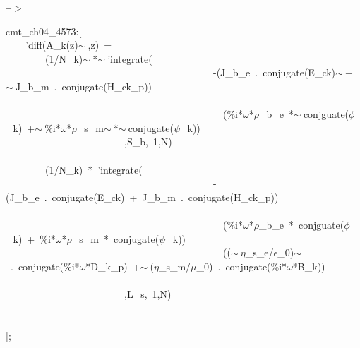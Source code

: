 \documentclass[fleqn]{article}
\begin{document}
\noindent
\begin{minipage}[t]{4.000000em}\color{red}\bfseries
 --\ensuremath{\ensuremath{>}}	
\end{minipage}
\begin{minipage}[t]{\textwidth}\color{blue}
cmt\_ch04\_4573:[\\
\ \ \ \ 'diff(A\_k(z)\ensuremath{\sim\ },z)\ =\ \\
\ \ \ \ \ \ \ \ (1/N\_k)\ensuremath{\sim\ }*\ensuremath{\sim\ }'integrate(\ \\
\ \ \ \ \ \ \ \ \ \ \ \ \ \ \ \ \ \ \ \ \ \ \ \ \ \ \ \ \ \ \ \ \ \ \ \ \ \ \ \ \ \ -(J\_b\_e\ .\ conjugate(E\_ck)\ensuremath{\sim\ }+\ensuremath{\sim\ }J\_b\_m\ .\ conjugate(H\_ck\_p))\ \\
\ \ \ \ \ \ \ \ \ \ \ \ \ \ \ \ \ \ \ \ \ \ \ \ \ \ \ \ \ \ \ \ \ \ \ \ \ \ \ \ \ \ \ \ +\\
\ \ \ \ \ \ \ \ \ \ \ \ \ \ \ \ \ \ \ \ \ \ \ \ \ \ \ \ \ \ \ \ \ \ \ \ \ \ \ \ \ \ \ \ (\%i*\ensuremath{\omega}*\ensuremath{\rho}\_b\_e\ *\ensuremath{\sim\ }conjguate(\ensuremath{\phi}\_k)\ +\ensuremath{\sim\ }\%i*\ensuremath{\omega}*\ensuremath{\rho}\_s\_m\ensuremath{\sim\ }*\ensuremath{\sim\ }conjugate(\ensuremath{\psi}\_k))\ \\
\ \ \ \ \ \ \ \ \ \ \ \ \ \ \ \ \ \ \ \ \ \ \ \ ,S\_b,\ 1,N)\\
\ \ \ \ \ \ \ \ +\\
\ \ \ \ \ \ \ \ (1/N\_k)\ *\ 'integrate(\ \\
\ \ \ \ \ \ \ \ \ \ \ \ \ \ \ \ \ \ \ \ \ \ \ \ \ \ \ \ \ \ \ \ \ \ \ \ \ \ \ \ \ \ -(J\_b\_e\ .\ conjugate(E\_ck)\ +\ J\_b\_m\ .\ conjugate(H\_ck\_p))\ \\
\ \ \ \ \ \ \ \ \ \ \ \ \ \ \ \ \ \ \ \ \ \ \ \ \ \ \ \ \ \ \ \ \ \ \ \ \ \ \ \ \ \ \ \ +\\
\ \ \ \ \ \ \ \ \ \ \ \ \ \ \ \ \ \ \ \ \ \ \ \ \ \ \ \ \ \ \ \ \ \ \ \ \ \ \ \ \ \ \ \ (\%i*\ensuremath{\omega}*\ensuremath{\rho}\_b\_e\ *\ conjguate(\ensuremath{\phi}\_k)\ +\ \%i*\ensuremath{\omega}*\ensuremath{\rho}\_s\_m\ *\ conjugate(\ensuremath{\psi}\_k))\ \\
\ \ \ \ \ \ \ \ \ \ \ \ \ \ \ \ \ \ \ \ \ \ \ \ \ \ \ \ \ \ \ \ \ \ \ \ \ \ \ \ \ \ \ \ ((\ensuremath{\sim\ }\ensuremath{\eta}\_s\_e/\ensuremath{\epsilon}\_0)\ensuremath{\sim\ }\ .\ conjugate(\%i*\ensuremath{\omega}*D\_k\_p)\ +\ensuremath{\sim\ }(\ensuremath{\eta}\_s\_m/\ensuremath{\mu}\_0)\ .\ conjugate(\%i*\ensuremath{\omega}*B\_k))\\
\\
\ \ \ \ \ \ \ \ \ \ \ \ \ \ \ \ \ \ \ \ \ \ \ \ ,L\_s,\ 1,N)\\
\ \ \ \ \ \ \ \ \\
\\
];
\end{minipage}
\end{document}
